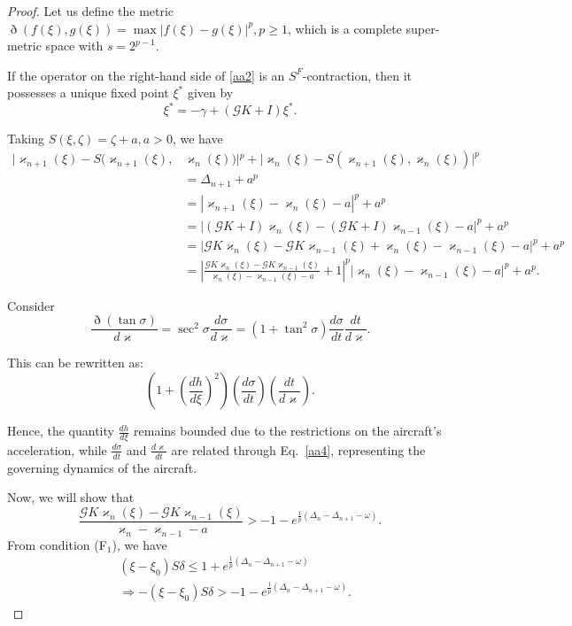 \documentclass[pdflatex,sn-mathphys-num]{sn-jnl}%
\theoremstyle{thmstyleone}%
\theoremstyle{thmstyletwo}%
\theoremstyle{thmstylethree}%
\begin{document}
\begin{proof}
    
 Let us define the metric $\eth(f(\xi), g(\xi)) = \max |f(\xi) - g(\xi)|^p,p\ge1$, which is a complete super-metric space with $s=2^{p-1}$.

If the operator on the right-hand side of \eqref{aa2} is an $S^F$-contraction, then it possesses a unique fixed point $\xi^*$ given by
\[
\xi^* = -\gamma + (\mathcal{G}K + I)\xi^*.
\]

Taking $S(\xi,\zeta)=\zeta+ a, a> 0$, we have
\begin{equation}\label{a1}
\begin{split}
|\varkappa_{n+1}(\xi)-S(\varkappa_{n+1}(\xi),&\varkappa_{n}(\xi))|^p+|\varkappa_{n}(\xi)-S(\varkappa_{n+1}(\xi),\varkappa_{n}(\xi))|^p\\
&= \Delta_{n+1}+a^p\\
&= \left|\varkappa_{n+1}(\xi) - \varkappa_{n}(\xi)-a\right|^p+a^p\\
&= \left|(\mathcal{G}K+I)\varkappa_{n}(\xi) - (\mathcal{G}K+I)\varkappa_{n-1}(\xi)-a\right|^p+a^p  \\
&= \left|\mathcal{G}K\varkappa_n(\xi) - \mathcal{G}K\varkappa_{n-1}(\xi) + \varkappa_n(\xi) - \varkappa_{n-1}(\xi)-a\right|^p+a^p \\
&= \left| \frac{\mathcal{G}K\varkappa_n(\xi) - \mathcal{G}K\varkappa_{n-1}(\xi)}{\varkappa_n(\xi) - \varkappa_{n-1}(\xi)-a} +1 \right|^p 
\left|\varkappa_n(\xi) - \varkappa_{n-1}(\xi)-a\right|^p+a^p. 
\end{split}
\end{equation}


Consider
\[
\frac{\eth(\tan \sigma)}{d\varkappa} = \sec^2\sigma\frac{d\sigma}{d\varkappa} = (1 + \tan^2 \sigma)\frac{d\sigma}{dt}\frac{dt}{d\varkappa}.
\]

This can be rewritten as:
\[
\left(1 + \left(\frac{dh}{d\xi} \right)^2\right)
\left(\frac{d\sigma}{dt}\right)\left(\frac{dt}{d\varkappa}\right).
\]

Hence, the quantity $\frac{dh}{d\xi}$ remains bounded due to the restrictions on the aircraft's acceleration, while $\frac{d\sigma}{dt}$ and $\frac{d\varkappa}{dt}$ are related through Eq.~\eqref{aa4}, representing the governing dynamics of the aircraft.

Now, we will show that \[
\frac{\mathcal{G}K\varkappa_n(\xi) - \mathcal{G}K\varkappa_{n-1}(\xi)}{\varkappa_n - \varkappa_{n-1}-a} > -1 - e^{\frac{1}{p}(\Delta_n-\Delta_{n+1}-\omega  )}.
\]
From condition (F$_1$), we have
\begin{equation}\label{a3}
\begin{split}
 &(\xi - \xi_0)S\delta \le 1 + e^{\frac{1}{p}(\Delta_n-\Delta_{n+1}-\omega  )} \\
&\Rightarrow  -(\xi - \xi_0)S\delta >- 1 - e^{\frac{1}{p}(\Delta_n-\Delta_{n+1}-\omega  )}. 
\end{split}
\end{equation}


\end{proof}
\end{document}
